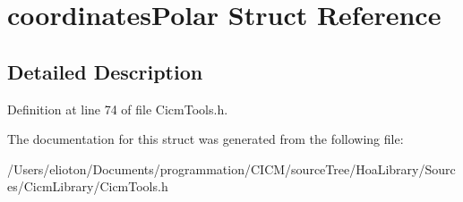 \hypertarget{structcoordinates_polar}{\section{coordinates\-Polar Struct Reference}
\label{structcoordinates_polar}
}


\subsection{Detailed Description}


Definition at line 74 of file Cicm\-Tools.\-h.



The documentation for this struct was generated from the following file\-:\begin{DoxyCompactItemize}
\item 
/\-Users/elioton/\-Documents/programmation/\-C\-I\-C\-M/source\-Tree/\-Hoa\-Library/\-Sources/\-Cicm\-Library/Cicm\-Tools.\-h\end{DoxyCompactItemize}
